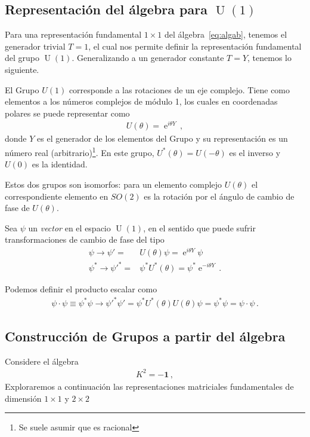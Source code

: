 \subsection{Representación del álgebra para $\operatorname{U}(1)$}
Para una representación fundamental $1\times 1$ del álgebra~\eqref{eq:algab}, tenemos el generador trivial $T=1$, el cual nos permite definir la representación fundamental del grupo  $\operatorname{U}(1)$. Generalizando a un generador constante $T=Y$, tenemos lo siguiente.



 El Grupo $U(1)$ corresponde a las rotaciones de un eje complejo. Tiene como elementos a los números complejos de módulo 1, los cuales en coordenadas polares se puede representar como
\begin{align}
  U(\theta)=\operatorname{e}^{i \theta Y}\,,
\end{align}
donde $Y$ es el generador de los elementos del Grupo y su representación es un número real (arbitrario)\footnote{Se suele asumir que es racional}.  En este grupo, $U^{*}(\theta)=U(-\theta)$ es el inverso y $U(0)$ es la identidad.

Estos dos grupos son isomorfos: para un elemento complejo $U(\theta)$ el correspondiente elemento en $SO(2)$ es la rotación por el ángulo de cambio de fase de $U(\theta)$.

\begin{frame}
Sea $\psi$ un \emph{vector} en el espacio $\operatorname{U}(1)$, en el sentido que puede sufrir transformaciones de cambio de fase del tipo
\begin{align}
  \psi\to \psi'=& U(\theta)\psi= \operatorname{e}^{i \theta Y}\psi \nonumber\\
  \psi^{*}\to {\psi'}^{*}=&\psi^{*} U^{*}(\theta)=\psi^{*}\operatorname{e}^{-i \theta Y}\,.
\end{align}


Podemos definir el producto escalar como
\begin{align}
  \psi\cdot \psi\equiv\psi^{*} \psi
  \to {\psi'}^{*} \psi'=\psi^{*} U^{*}(\theta) U(\theta) \psi=\psi^{*} \psi=\psi\cdot \psi\,.
\end{align}
\end{frame}

\subsection{Construcción de Grupos a partir del álgebra}
\begin{frame}
Considere el álgebra
\begin{align}
  K^2=-\boldsymbol{1}\,,
\end{align}
Exploraremos a continuación las representaciones matriciales fundamentales de dimensión $1\times1$ y $2\times2$

\end{frame}
